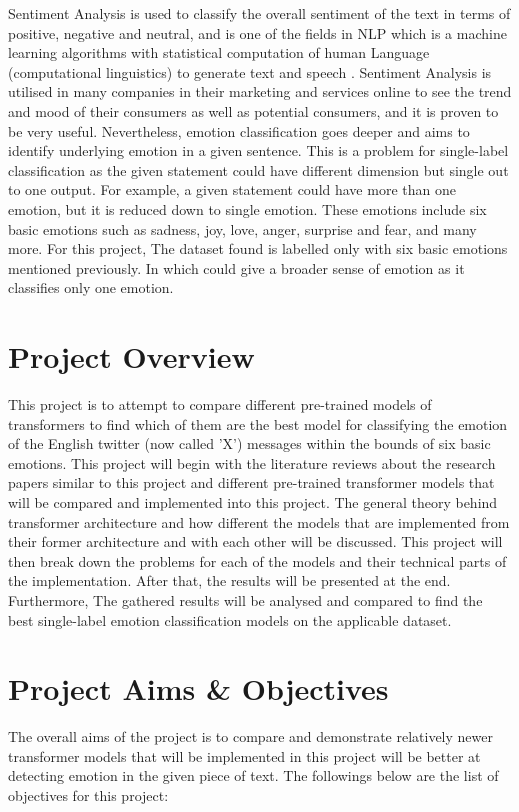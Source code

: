 Sentiment Analysis is used to classify the overall sentiment of the text in terms of positive, negative and neutral, 
and is one of the fields in NLP which is a machine learning algorithms with statistical computation of human Language (computational linguistics)
to generate text and speech \cite{nlp}. 
Sentiment Analysis is utilised in many companies in their marketing and services online to see the trend and mood of their consumers as well as potential consumers, and it is proven to be very useful.
Nevertheless, emotion classification goes deeper and aims to identify underlying emotion in a given sentence.
This is a problem for single-label classification as the given statement could have different dimension but single out to one output.
For example, a given statement could have more than one emotion, but it is reduced down to single emotion.
These emotions include six basic emotions such as sadness, joy, love, anger, surprise and fear, and many more.
For this project, The dataset \cite{saravia-etal-2018-carer} found is labelled only with six basic emotions mentioned previously.
In which could give a broader sense of emotion as it classifies only one emotion.

\section{Project Overview}

This project is to attempt to compare different pre-trained models of transformers to find which of them are the best model for classifying the emotion of the English twitter (now called 'X') messages within the bounds of six basic emotions.
This project will begin with the literature reviews about the research papers similar to this project and different pre-trained transformer models that will be compared and implemented into this project. 
The general theory behind transformer architecture and how different the models that are implemented from their former architecture and with each other will be discussed.
This project will then break down the problems for each of the models and their technical parts of the implementation. 
After that, the results will be presented at the end. Furthermore, The gathered results will be analysed and compared to find the best single-label emotion classification models on the applicable dataset.

\section{Project Aims \& Objectives}
The overall aims of the project is to compare and demonstrate relatively newer transformer models that will be implemented in this project
will be better at detecting emotion in the given piece of text. The followings below are the list of objectives for this project:

